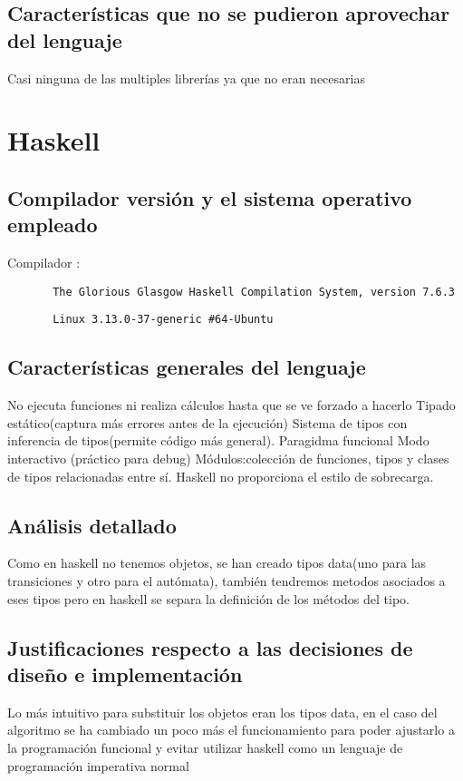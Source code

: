 \documentclass[12pt,a4paper]{article}
\begin{document}
    \subsection{Características que no se pudieron aprovechar del lenguaje}
    Casi ninguna de las multiples librerías ya que no eran necesarias
     \section{Haskell}
       \subsection{Compilador versión y el sistema operativo empleado}
       Compilador :
       \begin{lstlisting}
       The Glorious Glasgow Haskell Compilation System, version 7.6.3
       \end{lstlisting}
       \begin{lstlisting}
       Linux 3.13.0-37-generic #64-Ubuntu
       \end{lstlisting}
       \subsection{Características generales del lenguaje}
       	No ejecuta funciones ni realiza cálculos hasta que se ve forzado a hacerlo
        Tipado estático(captura más errores antes de la ejecución)
        Sistema de tipos con inferencia de tipos(permite código más general).
        Paragidma funcional
        Modo interactivo (práctico para debug)
        Módulos:colección de funciones, tipos y clases de tipos relacionadas entre sí.
        Haskell no proporciona el estilo de sobrecarga.
       \subsection{Análisis detallado}
        Como en haskell no tenemos objetos, se han creado tipos data(uno para las transiciones y otro para el autómata), también tendremos metodos asociados a eses tipos pero en haskell se separa la definición de los métodos del tipo.
        
       \subsection{Justificaciones respecto a las decisiones de diseño e implementación}
       Lo más intuitivo para substituir los objetos eran los tipos data, en el caso del algoritmo se ha cambiado un poco más el funcionamiento para poder ajustarlo a la programación funcional y evitar utilizar haskell como un lenguaje de programación imperativa normal
\end{document}
